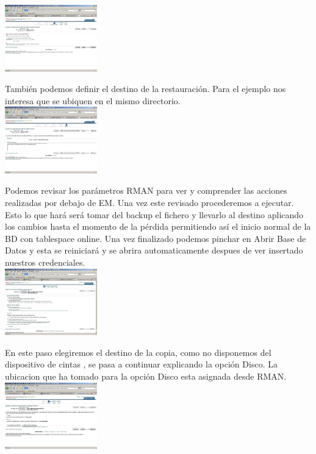 \documentclass[a4paper,twocolumn,10pt]{article}
\begin{document}
          \includegraphics[width=0.3\textwidth]{./Imagenes/recu_5.jpg}
          
          \normalsize Tambi\'en podemos definir el destino de la restauraci\'on. Para el ejemplo  nos interesa que se ubiquen en el mismo directorio. \\ 

         
          \includegraphics[width=0.3\textwidth]{./Imagenes/recu_6.jpg}
      

           \normalsize Podemos revisar los par\'ametros RMAN para ver y comprender las acciones realizadas por debajo de EM. Una vez este revisado procederemos a ejecutar. 
 Esto lo que har\'a ser\'a tomar del backup el fichero y llevarlo al destino aplicando los cambios hasta el momento de la p\'erdida permitiendo as\'i el inicio normal de la BD con tablespace online. 
Una vez finalizado podemos pinchar en Abrir Base de Datos y esta se reiniciar\'a y se abrira automaticamente despues de ver insertado nuestros credenciales.\\ 

\includegraphics[width=0.3\textwidth]{./Imagenes/eje1.jpg}
      
 En este paso elegiremos el destino de la copia, como no disponemos del dispositivo de cintas , se pasa a continuar explicando la opci\'on Disco. La ubicacion que ha tomado para la opci\'on 
Disco esta asignada desde RMAN.
\includegraphics[width=0.3\textwidth]{./Imagenes/eje2.jpg}
\end{document}
